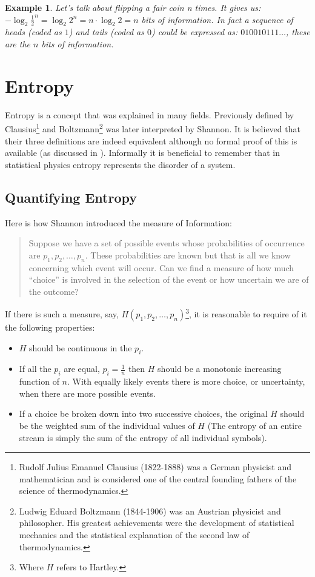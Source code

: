 \documentclass[12pt, a4paper]{report}
\newtheorem{example}{Example} %
\begin{document}
\begin{example}
Let's talk about flipping a fair coin n times. It gives us: \(- \log_2 \frac{1}{2}^n = \log_2 2^n = n \cdot \log_2 2 = n\) bits of
information. In fact a sequence of heads (coded as \(1\)) and tails (coded as \(0\)) could be expressed as: \(010010111\dots\),
these are the \(n\) bits of information.
\end{example}

\chapter{Entropy}

Entropy is a concept that was explained in many fields.
Previously defined by Clausius\footnote{Rudolf Julius Emanuel Clausius (1822-1888) was a German physicist and mathematician and is
considered one of the central founding fathers of the science of thermodynamics.} and Boltzmann\footnote{Ludwig Eduard Boltzmann
(1844-1906) was an Austrian physicist and philosopher. His greatest achievements were the development of statistical mechanics and
the statistical explanation of the second law of thermodynamics.} was later interpreted by Shannon.
It is believed that their three definitions are indeed equivalent although no formal proof of this is available (as discussed in
\cite{EntropyAndInformationTheoryUsesAndMisuses}).
Informally it is beneficial to remember that in statistical physics entropy represents the disorder of a system.

\section{Quantifying Entropy}

Here is how Shannon introduced the measure of Information:
\begin{quote}
Suppose we have a set of possible events whose probabilities of occurrence are \(p_1, p_2, \dots, p_n\).
These probabilities are known but that is all we know concerning which event will occur.
Can we find a measure of how much ``choice'' is involved in the selection of the event or how uncertain we are of the outcome?
\end{quote}
If there is such a measure, say, \(H(p_1, p_2, \dots, p_n)\)\footnote{Where \(H\) refers to Hartley.}, it is reasonable to require
of it the following properties:
\begin{itemize}
  \item \(H\) should be continuous in the \(p_i\).
  \item If all the \(p_i\) are equal, \(p_i = \frac{1}{n}\) then \(H\) should be a monotonic increasing function of \(n\). With
        equally likely events there is more choice, or uncertainty, when there are more possible events.
  \item If a choice be broken down into two successive choices, the original \(H\) should be the weighted sum of the individual
        values of \(H\) (The entropy of an entire stream is simply the sum of the entropy of all individual symbols).
\end{itemize}
\end{document}
